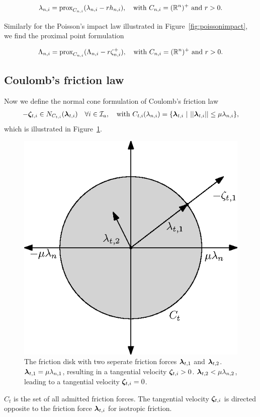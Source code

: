 \documentclass[../DC2017114Bouma.tex]{subfiles}
\begin{document}
\begin{align}
\lambda_{n,i} = \operatorname{\text{prox}}_{C_{n,i}}(\lambda_{n,i} - rh_{n,i}),\quad \text{with }C_{n,i} = (\mathbb{R}^n)^+\text{ and } r>0.
\end{align}

Similarly for the Poisson's impact law illustrated in Figure~\ref{fig:poissonimpact}, we find the proximal point formulation

\begin{align}
\Lambda_{n,i} = \operatorname{\text{prox}}_{C_{n,i}}(\Lambda_{n,i} - r\zeta^+_{n,i}),\quad \text{with }C_{n,i} = (\mathbb{R}^n)^+\text{ and } r>0.
\end{align}

\subsection{Coulomb's friction law}
Now we define the normal cone formulation of Coulomb's friction law
\begin{align}
-\zetab_{t,i} \in N_{C_{t,i}}(\lambdab_{t,i})\quad \forall i\in\Ic_a,\quad \text{with }C_{t,i}(\lambda_{n,i}) = \{\lambdab_{t,i}\ |\ ||\lambdab_{t,i}|| \leq \mu\lambda_{n,i}\},
\end{align}
which is illustrated in Figure~\ref{fig:frictiondisk}.  

\begin{figure}[h]
\centering
\includegraphics[width=.4\textwidth]{frictiondisk.eps}\caption{The friction disk with two seperate friction forces $\boldsymbol{\lambda}_{t,1}$ and $\boldsymbol{\lambda}_{t,2}$. $\boldsymbol{\lambda}_{t,1} = \mu\lambda_{n,1}$, resulting in a tangential velocity $\boldsymbol{\zeta}_{t,i}>0$. $\boldsymbol{\lambda}_{t,2}<\mu\lambda_{n,2}$, leading to a tangential velocity $\boldsymbol{\zeta}_{t,i}=0$.}\label{fig:frictiondisk}
\end{figure}

$C_t$ is the set of all admitted friction forces. The tangential velocity $\boldsymbol{\zeta}_{t,i}$ is directed opposite to the friction force $\boldsymbol{\lambda}_{t,i}$ for isotropic friction. 
\end{document}
